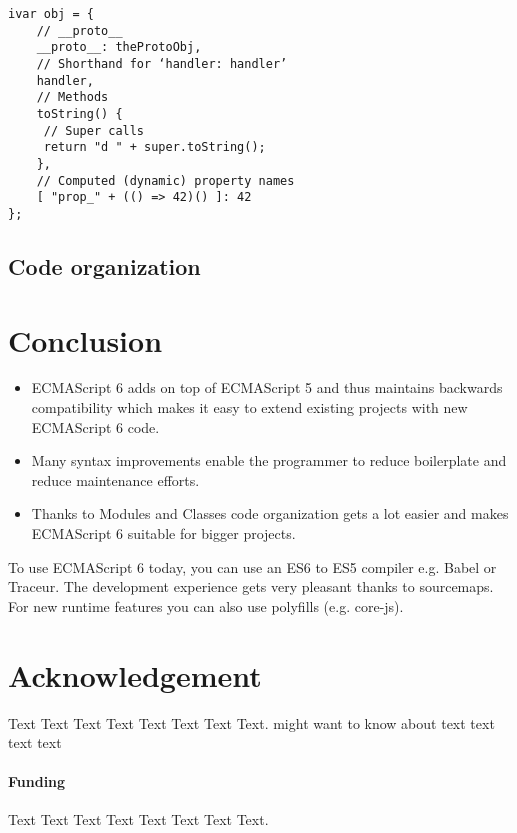 \documentclass{bioinfo}
\begin{document}
\begin{lstlisting}[caption= My Javascript Example]
ivar obj = {
    // __proto__
    __proto__: theProtoObj,
    // Shorthand for ‘handler: handler’
    handler,
    // Methods
    toString() {
     // Super calls
     return "d " + super.toString();
    },
    // Computed (dynamic) property names
    [ "prop_" + (() => 42)() ]: 42
};
\end{lstlisting}
\subsection{Code organization}




\section{Conclusion}
\begin{itemize}
        \item ECMAScript 6 adds on top of ECMAScript 5 and thus maintains backwards compatibility which makes it easy to extend existing projects with new ECMAScript 6 code. 
        \item Many syntax improvements enable the programmer to reduce boilerplate and reduce maintenance efforts. 
        \item Thanks to Modules and Classes code organization gets a lot easier and makes ECMAScript 6 suitable for bigger projects.
\end{itemize}
To use ECMAScript 6 today, you can use an ES6 to ES5 compiler e.g. Babel or Traceur. The development experience gets
very pleasant thanks to sourcemaps. For new runtime features you can also use polyfills (e.g. core-js).

\section*{Acknowledgement}
Text Text Text Text Text Text  Text Text.  \citealp{Boffelli03} might want to know about  text text text text

\paragraph{Funding\textcolon} Text Text Text Text Text Text  Text Text.
\end{document}
